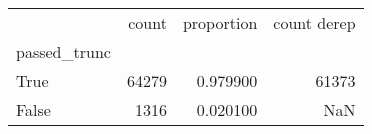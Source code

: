 \begin{tabular}{lrrr}
\toprule
 & count & proportion & count derep \\
passed_trunc &  &  &  \\
\midrule
True & 64279 & 0.979900 & 61373 \\
False & 1316 & 0.020100 & NaN \\
\bottomrule
\end{tabular}
